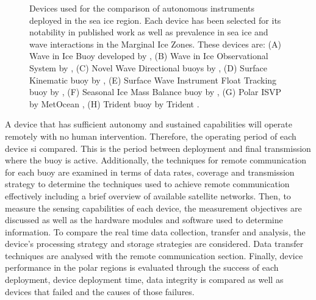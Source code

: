 \begin{figure}[H]
\begin{subfigure}[b]{0.24\textwidth}
		\label{fig:UptempO}
	\end{subfigure}%
	\hfill
	\begin{subfigure}[b]{0.24\textwidth}
		\centering
		\label{fig:trident}
	\end{subfigure}%
	\hfill
	\caption{ Devices used for the comparison of autonomous instruments deployed in the sea ice region. Each device has been selected for its notability in published work as well as prevalence in sea ice and wave interactions in the Marginal Ice Zones. These devices are: (A) Wave in Ice Buoy developed by \textcite{rabault2017measurements}, (B) Wave in Ice Observational System by \textcite{kohout2015device}, (C) Novel Wave Directional buoys by \textcite{doble2017robust}, (D) Surface Kinematic buoy by \textcite{guimaraes2018surface}, (E) Surface Wave Instrument Float Tracking buoy by \textcite{thomson2012wave}, (F) Seasonal Ice Mass Balance buoy by \textcite{polashenski2011seasonal,meng2014optimal}, (G) Polar ISVP  by MetOcean \cite{uptempo}, (H) Trident buoy by Trident \cite{trident}.}
	\label{fig:buoys}
\end{figure}


A device that has sufficient autonomy and sustained capabilities will operate remotely with no human intervention. Therefore, the operating period of each device si compared. This is the period between deployment and final transmission where the buoy is active. Additionally, the techniques for remote communication for each buoy are examined in terms of data rates, coverage and transmission strategy to determine the techniques used to achieve remote communication effectively including a brief overview of available satellite networks. Then, to measure the sensing capabilities of each device, the measurement objectives are discussed as well as the hardware modules and software used to determine information. To compare the real time data collection, transfer and analysis, the device's processing strategy and storage strategies are considered. Data transfer techniques are analysed with the remote communication section. Finally, device performance in the polar regions is evaluated through the success of each deployment, device deployment time, data integrity is compared as well as devices that failed and the causes of those failures.

